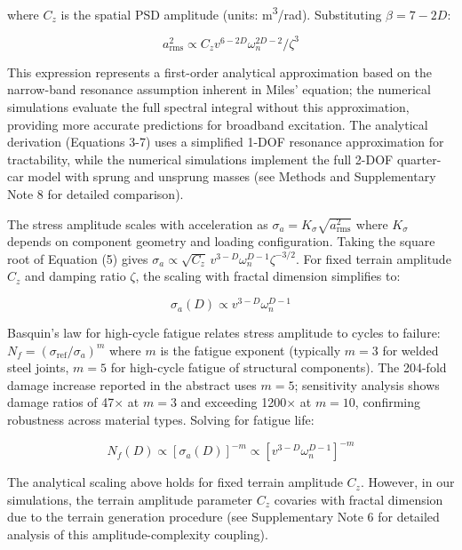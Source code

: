 \documentclass[11pt]{article}
\begin{document}
where $C_z$ is the spatial PSD amplitude (units: m\textsuperscript{3}/rad). Substituting $\beta = 7-2D$:

\begin{equation}
a_{\text{rms}}^2 \propto C_z v^{6-2D} \omega_n^{2D-2} / \zeta^3
\end{equation}

This expression represents a first-order analytical approximation based on the narrow-band resonance assumption inherent in Miles' equation; the numerical simulations evaluate the full spectral integral without this approximation, providing more accurate predictions for broadband excitation. The analytical derivation (Equations 3-7) uses a simplified 1-DOF resonance approximation for tractability, while the numerical simulations implement the full 2-DOF quarter-car model with sprung and unsprung masses (see Methods and Supplementary Note 8 for detailed comparison).

The stress amplitude scales with acceleration as $\sigma_a = K_\sigma \sqrt{a_{\text{rms}}^2}$ where $K_\sigma$ depends on component geometry and loading configuration. Taking the square root of Equation (5) gives $\sigma_a \propto \sqrt{C_z} \, v^{3-D} \omega_n^{D-1} \zeta^{-3/2}$. For fixed terrain amplitude $C_z$ and damping ratio $\zeta$, the scaling with fractal dimension simplifies to:

\begin{equation}
\sigma_a(D) \propto v^{3-D} \omega_n^{D-1}
\end{equation}

Basquin's law for high-cycle fatigue relates stress amplitude to cycles to failure: $N_f = (\sigma_{\text{ref}}/\sigma_a)^m$ where $m$ is the fatigue exponent (typically $m = 3$ for welded steel joints, $m = 5$ for high-cycle fatigue of structural components)\cite{Basquin1910,Dowling2013}. The 204-fold damage increase reported in the abstract uses $m = 5$; sensitivity analysis shows damage ratios of 47$\times$ at $m = 3$ and exceeding 1200$\times$ at $m = 10$, confirming robustness across material types. Solving for fatigue life:

\begin{equation}
N_f(D) \propto [\sigma_a(D)]^{-m} \propto [v^{3-D} \omega_n^{D-1}]^{-m}
\end{equation}

The analytical scaling above holds for fixed terrain amplitude $C_z$. However, in our simulations, the terrain amplitude parameter $C_z$ covaries with fractal dimension due to the terrain generation procedure (see Supplementary Note 6 for detailed analysis of this amplitude-complexity coupling). 
\end{document}
